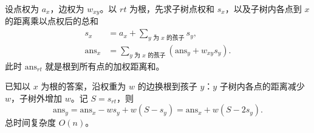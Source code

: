 设点权为 $a_x$，边权为 $w_{xy}$。以 $rt$ 为根，先求子树点权和 $s_x$，以及子树内各点到 $x$ 的距离乘以点权后的总和
\[
\begin{aligned}
s_x&=a_x+\sum_{y\text{ 为 }x\text{ 的孩子}}s_y,\\
\mathrm{ans}_x&=\sum_{y\text{ 为 }x\text{ 的孩子}}(\mathrm{ans}_y+w_{xy}s_y).
\end{aligned}
\]
此时 $\mathrm{ans}_{rt}$ 就是根到所有点的加权距离和。

已知以 $x$ 为根的答案，沿权重为 $w$ 的边换根到孩子 $y$：$y$ 子树内各点的距离减少 $w$，子树外增加 $w$。记 $S=s_{rt}$，则
\[
\mathrm{ans}_y=\mathrm{ans}_x-ws_y+w(S-s_y)
=\mathrm{ans}_x+w(S-2s_y).
\]
总时间复杂度 $O(n)$。
